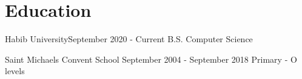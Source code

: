 \section{Education}
  \resumeSubHeadingListStart
  
    \resumeSubheading
      {Habib University}{September 2020 - Current}
      {B.S. Computer Science}{}
      
    \resumeSubheading
      {Saint Michaels Convent School \footnotesize{}}{September 2004 - September 2018 }
      {Primary - O levels}{}    

      \resumeSubHeadingListEnd
